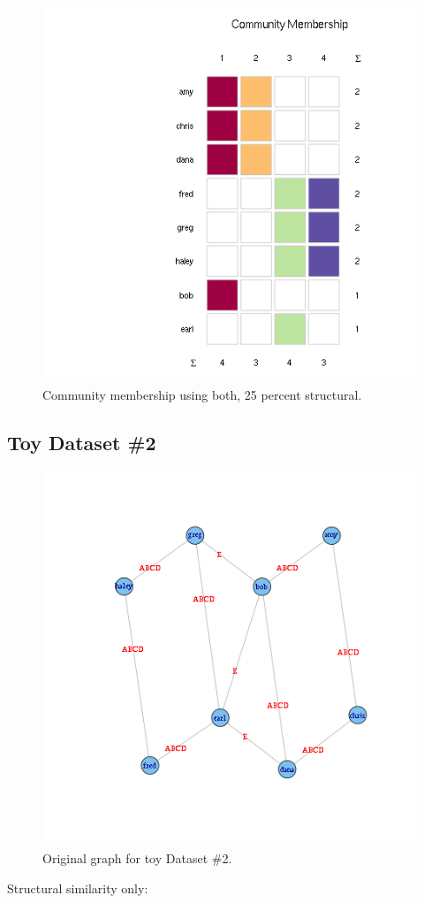 \documentclass{report}
\begin{document}
\begin{figure}[htp!]
  \centering
  \includegraphics[width=0.65\linewidth]{toy2/ea/top20_0.25.png}
  \caption{Community membership using both, 25 percent structural.}
\end{figure}




\subsection*{Toy Dataset \#2}

\begin{figure}[htp!]
  \centering
  \includegraphics[width=0.65\linewidth]{toy3/orig.png}
  \caption{Original graph for toy Dataset \#2.}
\end{figure}


Structural similarity only:
\end{document}
